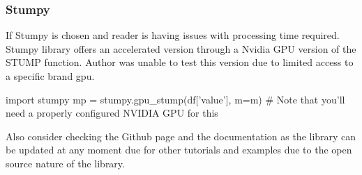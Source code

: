\subsubsection{Stumpy}
If Stumpy is chosen and reader is having issues with processing time required. Stumpy library offers an accelerated version through a Nvidia GPU version of the STUMP function. Author was unable to test this version due to limited access to a specific brand gpu. 
\begin{python}
import stumpy
mp = stumpy.gpu_stump(df['value'], m=m)  
# Note that you'll need a properly configured NVIDIA GPU for this
\end{python}

Also consider checking the Github page and the documentation as the library can be updated at any moment due for other tutorials and examples due to the open source nature of the library. \cite{law2019stumpy}
